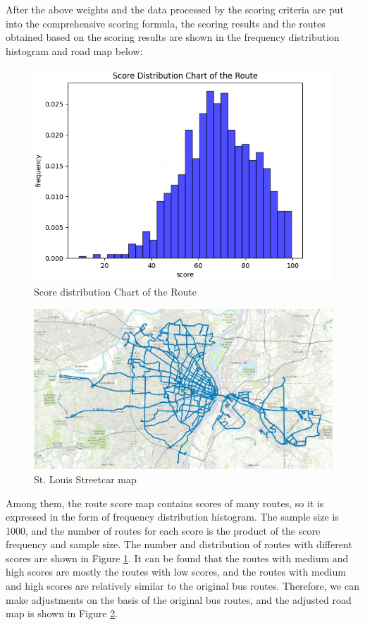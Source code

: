 \documentclass[12pt]{article}
\begin{document}
After the above weights and the data processed by the scoring criteria are put into the comprehensive scoring formula, 
the scoring results and the routes obtained based on the scoring results are shown in the frequency distribution histogram and road map below:
\begin{figure}[H]
	\centering
	\includegraphics[scale=0.6]{score.png}%
	\caption{Score distribution Chart of the Route} 
	\label{score.png}%
\end{figure}

\begin{figure}[H]
	\centering
	\includegraphics[scale=0.4]{city s.jpg}%
	\caption{St. Louis Streetcar map} %
	\label{city s.jpg}
\end{figure}
Among them, the route score map contains scores of many routes, so it is expressed in the form of frequency distribution 
histogram. The sample size is 1000, and the number of routes for each score is the product of the score frequency and sample size. 
The number and distribution of routes with different scores are shown in Figure \ref{score.png}. It can be found that the routes with medium 
and high scores are mostly the routes with low scores, and the routes with medium and high scores are relatively similar to the 
original bus routes. Therefore, we can make adjustments on the basis of the original bus routes, and the adjusted road map is shown 
in Figure \ref{city s.jpg}.
\end{document}
